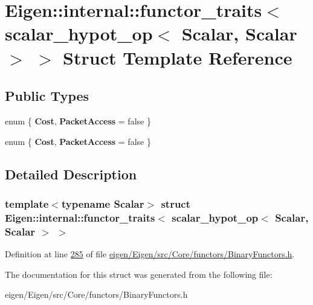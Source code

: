 \hypertarget{struct_eigen_1_1internal_1_1functor__traits_3_01scalar__hypot__op_3_01_scalar_00_01_scalar_01_4_01_4}{}\section{Eigen\+:\+:internal\+:\+:functor\+\_\+traits$<$ scalar\+\_\+hypot\+\_\+op$<$ Scalar, Scalar $>$ $>$ Struct Template Reference}
\label{struct_eigen_1_1internal_1_1functor__traits_3_01scalar__hypot__op_3_01_scalar_00_01_scalar_01_4_01_4}
\subsection*{Public Types}
\begin{DoxyCompactItemize}
\item 
\mbox{\label{struct_eigen_1_1internal_1_1functor__traits_3_01scalar__hypot__op_3_01_scalar_00_01_scalar_01_4_01_4_a8f565da5276a9c6ed8d179d6305a1ccb}} 
enum \{ {\bfseries Cost}, 
{\bfseries Packet\+Access} = false
 \}
\item 
\mbox{\label{struct_eigen_1_1internal_1_1functor__traits_3_01scalar__hypot__op_3_01_scalar_00_01_scalar_01_4_01_4_a786338d98166ce5b9ece36fac6711510}} 
enum \{ {\bfseries Cost}, 
{\bfseries Packet\+Access} = false
 \}
\end{DoxyCompactItemize}


\subsection{Detailed Description}
\subsubsection*{template$<$typename Scalar$>$\newline
struct Eigen\+::internal\+::functor\+\_\+traits$<$ scalar\+\_\+hypot\+\_\+op$<$ Scalar, Scalar $>$ $>$}



Definition at line \hyperlink{eigen_2_eigen_2src_2_core_2functors_2_binary_functors_8h_source_l00285}{285} of file \hyperlink{eigen_2_eigen_2src_2_core_2functors_2_binary_functors_8h_source}{eigen/\+Eigen/src/\+Core/functors/\+Binary\+Functors.\+h}.



The documentation for this struct was generated from the following file\+:\begin{DoxyCompactItemize}
\item 
eigen/\+Eigen/src/\+Core/functors/\+Binary\+Functors.\+h\end{DoxyCompactItemize}
